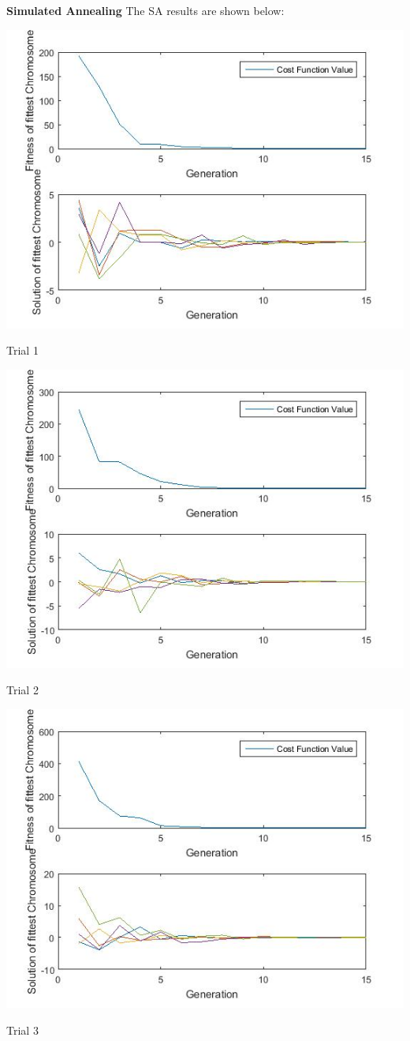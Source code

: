 \documentclass{article}
\begin{document}
\textbf{Simulated Annealing} The SA results are shown below:\\
\centerline{\includegraphics[width=0.5\linewidth]{sa_tf3_a}}
\centerline{Trial 1}
\centerline{\includegraphics[width=0.5\linewidth]{sa_tf3_b}}
\centerline{Trial 2}
\centerline{\includegraphics[width=0.5\linewidth]{sa_tf3_c}}
\centerline{Trial 3}
\end{document}
